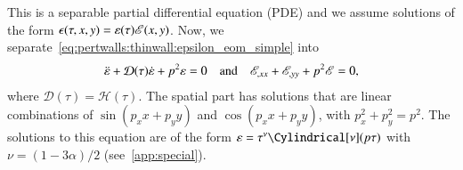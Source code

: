 This is a separable partial differential equation (PDE) and we assume solutions of the form $\epsilon(\tau, x, y) = \varepsilon(\tau)\mathscr{E}(x,y)$. Now, we separate~\cref{eq:pertwalls:thinwall:epsilon_eom_simple} into
\begin{align}\label{eq:pertwalls:thinwall:varepsilon_and_E_eoms}
    \ddot{\varepsilon} + \mathcal{D}(\tau) \dot{\varepsilon} + p^2 \varepsilon = 0 \quad\text{and}\quad  \mathscr{E}_{,xx} + \mathscr{E}_{,yy} + p^2 \mathscr{E} = 0,
\end{align}
where $\mathcal{D}(\tau) = \mathcal{H}(\tau)$. %
The spatial part has solutions that are linear combinations of $\sin{(p_x x+p_y y)}$ and $\cos{(p_x x+p_y y)}$, with $p_x^2+p_y^2 = p^2$. %
The solutions to this equation are of the form $\varepsilon = \tau^\nu \Cylindrical[\nu](p\tau)$ with $ \nu=(1-3\alpha)/2$ (see~\cref{app:special}).































